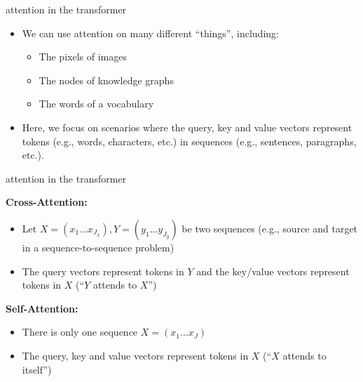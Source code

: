 
\begin{vbframe}{attention in the transformer}

\vfill

\begin{itemize}
\item We can use attention on many different ``things'', including: 
\begin{itemize}
\item The pixels of images
\item The nodes of knowledge graphs
\item The words of a vocabulary
\end{itemize}
\item Here, we focus on scenarios where the query, key and value vectors represent tokens (e.g., words, characters, etc.) in sequences (e.g., sentences, paragraphs, etc.).
\end{itemize}

\vfill

\end{vbframe}


\begin{vbframe}{attention in the transformer}

\vfill

\textbf{Cross-Attention:}
\begin{itemize}
\item Let $X = (x_1 \ldots x_{J_x}), Y = (y_1 \ldots y_{J_y})$ be two sequences (e.g., source and target in a sequence-to-sequence problem)
\item The query vectors represent tokens in $Y$ and the key/value vectors represent tokens in $X$ (``$Y$ attends to $X$'')
\end{itemize}

\medskip\medskip

\textbf{Self-Attention:}
\begin{itemize}
\item There is only one sequence $X = (x_1 \ldots x_J)$
\item The query, key and value vectors represent tokens in $X$ (``$X$ attends to itself'')
\end{itemize}

\vfill

\end{vbframe}

